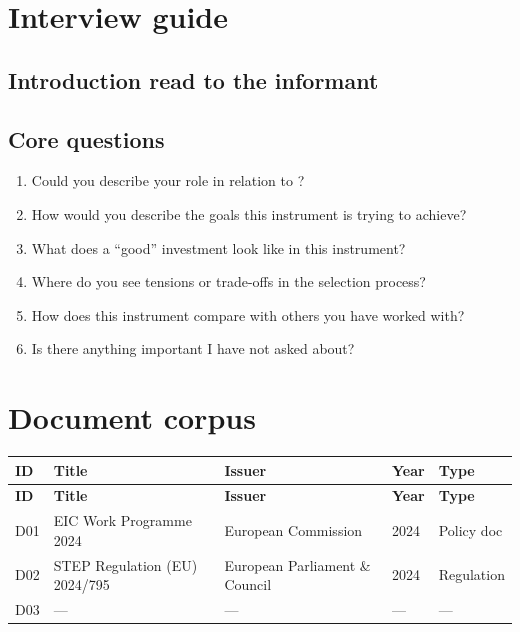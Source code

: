 
\chapter{Interview guide}
\label{app:interview-guide}

\section*{Introduction read to the informant}

\section*{Core questions}
\begin{enumerate}
    \item Could you describe your role in relation to
          ?
    \item How would you describe the goals this instrument is trying to
          achieve?
    \item What does a \enquote{good} investment look like in this
          instrument?
    \item Where do you see tensions or trade-offs in the selection process?
    \item How does this instrument compare with others you have worked
          with?
    \item Is there anything important I have not asked about?
\end{enumerate}

\chapter{Document corpus}
\label{app:doc-corpus}


\begin{longtable}{@{} l p{6.5cm} l l l @{}}
\toprule
\textbf{ID} & \textbf{Title} & \textbf{Issuer} & \textbf{Year} & \textbf{Type} \\
\midrule
\endfirsthead
\toprule
\textbf{ID} & \textbf{Title} & \textbf{Issuer} & \textbf{Year} & \textbf{Type} \\
\midrule
\endhead
\bottomrule
\endfoot
D01 & EIC Work Programme 2024 & European Commission & 2024 & Policy doc \\
D02 & STEP Regulation (EU) 2024/795 & European Parliament \& Council & 2024 & Regulation \\
D03 & --- & --- & --- & --- \\
\end{longtable}

